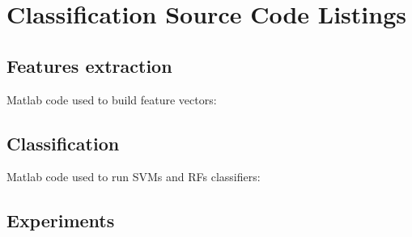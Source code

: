\chapter{Classification Source Code Listings}
\label{appendixB}
\thispagestyle{empty}


\section{Features extraction}

\label{appendixB:FE}
Matlab code used to build feature vectors:



\section{Classification}

\label{appendixB:Cl}
Matlab code used to run \Glspl{SVM} and \Glspl{RF} classifiers:



\section{Experiments}

\label{appendixB:exp1}
\label{appendixB:exp2}
\label{appendixB:exp3}
\label{appendixB:exp4}
\label{appendixB:exp5}
\label{appendixB:exp6}
\label{appendixB:exp7}

%